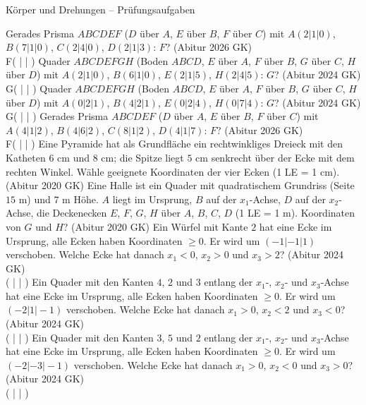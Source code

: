 \begin{aufgabe}{Körper und Drehungen – Prüfungsaufgaben}
\begin{teile}
\teil Gerades Prisma $ABCDEF$ ($D$ über $A$, $E$ über $B$, $F$ über $C$) mit $A(2 | 1 | 0)$, $B(7 | 1 | 0)$, $C(2 | 4 | 0)$, $D(2 | 1 | 3)$: $F$? \hfill (Abitur 2026 GK) \\ F( \leerfeld | \leerfeld | \leerfeld )
\teil Quader $ABCDEFGH$ (Boden $ABCD$, $E$ über $A$, $F$ über $B$, $G$ über $C$, $H$ über $D$) mit $A(2 | 1 | 0)$, $B(6 | 1 | 0)$, $E(2 | 1 | 5)$, $H(2 | 4 | 5)$: $G$? \hfill (Abitur 2024 GK) \\ G( \leerfeld | \leerfeld | \leerfeld )
\teil Quader $ABCDEFGH$ (Boden $ABCD$, $E$ über $A$, $F$ über $B$, $G$ über $C$, $H$ über $D$) mit $A(0 | 2 | 1)$, $B(4 | 2 | 1)$, $E(0 | 2 | 4)$, $H(0 | 7 | 4)$: $G$? \hfill (Abitur 2024 GK) \\ G( \leerfeld | \leerfeld | \leerfeld )
\teil Gerades Prisma $ABCDEF$ ($D$ über $A$, $E$ über $B$, $F$ über $C$) mit $A(4 | 1 | 2)$, $B(4 | 6 | 2)$, $C(8 | 1 | 2)$, $D(4 | 1 | 7)$: $F$? \hfill (Abitur 2026 GK) \\ F( \leerfeld | \leerfeld | \leerfeld )
\teil Eine Pyramide hat als Grundfläche ein rechtwinkliges Dreieck mit den Katheten $6$ cm und $8$ cm; die Spitze liegt $5$ cm senkrecht über der Ecke mit dem rechten Winkel. Wähle geeignete Koordinaten der vier Ecken (1 LE = 1 cm). \hfill (Abitur 2020 GK)
\teil Eine Halle ist ein Quader mit quadratischem Grundriss (Seite $15$ m) und $7$ m Höhe. $A$ liegt im Ursprung, $B$ auf der $x_1$-Achse, $D$ auf der $x_2$-Achse, die Deckenecken $E$, $F$, $G$, $H$ über $A$, $B$, $C$, $D$ (1 LE = 1 m). Koordinaten von $G$ und $H$? \hfill (Abitur 2020 GK)
\teil Ein Würfel mit Kante $2$ hat eine Ecke im Ursprung, alle Ecken haben Koordinaten $\ge 0$. Er wird um $(-1 | -1 | 1)$ verschoben. Welche Ecke hat danach $x_1 < 0$, $x_2 > 0$ und $x_3 > 2$? \hfill (Abitur 2024 GK) \\ ( \leerfeld | \leerfeld | \leerfeld )
\teil Ein Quader mit den Kanten $4$, $2$ und $3$ entlang der $x_1$-, $x_2$- und $x_3$-Achse hat eine Ecke im Ursprung, alle Ecken haben Koordinaten $\ge 0$. Er wird um $(-2 | 1 | -1)$ verschoben. Welche Ecke hat danach $x_1 > 0$, $x_2 < 2$ und $x_3 < 0$? \hfill (Abitur 2024 GK) \\ ( \leerfeld | \leerfeld | \leerfeld )
\teil Ein Quader mit den Kanten $3$, $5$ und $2$ entlang der $x_1$-, $x_2$- und $x_3$-Achse hat eine Ecke im Ursprung, alle Ecken haben Koordinaten $\ge 0$. Er wird um $(-2 | -3 | -1)$ verschoben. Welche Ecke hat danach $x_1 > 0$, $x_2 < 0$ und $x_3 > 0$? \hfill (Abitur 2024 GK) \\ ( \leerfeld | \leerfeld | \leerfeld )

\end{teile}
\end{aufgabe}
